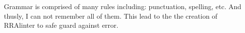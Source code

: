 \documentclass{article}
\begin{document}
Grammar is comprised of many rules including: punctuation, spelling, etc.
And thusly, I can not remember all of them.
This lead to the the creation of RRAlinter to safe guard against error. 
\end{document}
